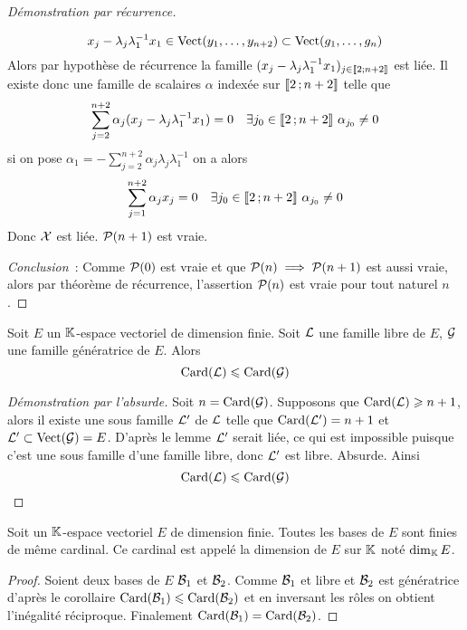 \begin{proof}[Démonstration par récurrence]
\begin{enumerate}
      \begin{equation}
        x_j - \lambda_j\lambda_1^{-1}x_1 \in \VectEngendre(y_1, \ldots, y_{n+2}) \subset \VectEngendre(g_1, \ldots, g_n)
      \end{equation}
      Alors par hypothèse de récurrence la famille \((x_j-\lambda_j\lambda_1^{-1}x_1)_{j \in \intervalleentier{2}{n+2}}\) est liée. Il existe donc une famille de scalaires \(\alpha\) indexée sur \(\intervalleentier{2}{n+2}\) telle que
      \begin{equation}
        \sum_{j=2}^{n+2} \alpha_j (x_j-\lambda_j\lambda_1^{-1}x_1) = 0 \quad \exists j_0 \in \intervalleentier{2}{n+2} \ \alpha_{j_0} \neq 0
      \end{equation}
      si on pose \(\alpha_1=-\sum_{j=2}^{n+2} \alpha_j \lambda_j \lambda_1^{-1}\) on a alors
      \begin{equation}
        \sum_{j=1}^{n+2} \alpha_j x_j =0 \quad \exists j_0 \in \intervalleentier{2}{n+2} \ \alpha_{j_0} \neq 0
      \end{equation}
      Donc \(\X\) est liée. \(\P(n+1)\) est vraie.
  \end{enumerate}

  \emph{Conclusion}~: Comme \(\P(0)\) est vraie et que \(\P(n) \implies \P(n+1)\) est aussi vraie, alors par théorème de récurrence, l'assertion \(\P(n)\) est vraie pour tout naturel \(n\).
\end{proof}

\begin{cor}
  Soit \(E\) un \(\K\)-espace vectoriel de dimension finie. Soit \(\Lb\) une famille libre de \(E\), \(\G\) une famille génératrice de \(E\). Alors
  \begin{equation}
    \Card(\Lb) \leqslant \Card(\G)
  \end{equation}
\end{cor}
\begin{proof}[Démonstration par l'absurde]
  Soit \(n = \Card(\G)\). Supposons que \(\Card(\Lb) \geqslant n+1\), alors il existe une sous famille \(\Lb'\) de \(\Lb\) telle que \(\Card(\Lb')=n+1\) et \(\Lb' \subset \VectEngendre(\G)=E\). D'après le lemme \(\Lb'\) serait liée, ce qui est impossible puisque c'est une sous famille d'une famille libre, donc \(\Lb'\) est libre. Absurde.  Ainsi 
  \begin{equation}
    \Card(\Lb) \leqslant \Card(\G)
  \end{equation}
\end{proof}

\begin{theo}
  \label{theo:dim}
  Soit un \(\K\)-espace vectoriel \(E\) de dimension finie. Toutes les bases de \(E\) sont finies de même cardinal. Ce cardinal est appelé la dimension de \(E\) sur \(\K\) noté \(\Dim_\K E\).
\end{theo}
\begin{proof}
  Soient deux bases de \(E\) \(\B_1\) et \(\B_2\). Comme \(\B_1\) et libre et \(\B_2\) est génératrice d'après le corollaire \(\Card(\B_1) \leqslant \Card(\B_2)\) et en inversant les rôles on obtient l'inégalité réciproque. Finalement \(\Card(\B_1)=\Card(\B_2)\).
\end{proof}

